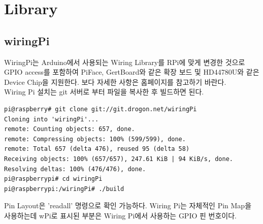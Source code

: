 \documentclass[11pt
  , a4paper
  , article
  , oneside
]{memoir}
\begin{document}
\section{Library}
\subsection{wiringPi}
WiringPi는 Arduino에서 사용되는 Wiring Library를 RPi에 맞게 변경한 것으로 GPIO access를 포함하여 
PiFace, GertBoard와 같은 확장 보드 및 HD44780U와 같은 Device Chip을 지원한다. 보다 자세한 사항은
홈페이지를 참고하기 바란다.\\

Wiring Pi 설치는 git 서버로 부터 파일을 복사한 후 빌드하면 된다.
\begin{lstlisting}[style=termstyle]
pi@raspberry# git clone git://git.drogon.net/wiringPi
Cloning into 'wiringPi'...
remote: Counting objects: 657, done.
remote: Compressing objects: 100% (599/599), done.
remote: Total 657 (delta 476), reused 95 (delta 58)
Receiving objects: 100% (657/657), 247.61 KiB | 94 KiB/s, done.
Resolving deltas: 100% (476/476), done.
pi@raspberrypi# cd wiringPi
pi@raspberrypi:/wiringPi# ./build
\end{lstlisting}
Pin Layout은 'readall' 명령으로 확인 가능하다. Wiring Pi는 자체적인 Pin Map을 사용하는데 wPi로 
표시된 부분은 Wiring Pi에서 사용하는 GPIO 핀 번호이다.
\end{document}
